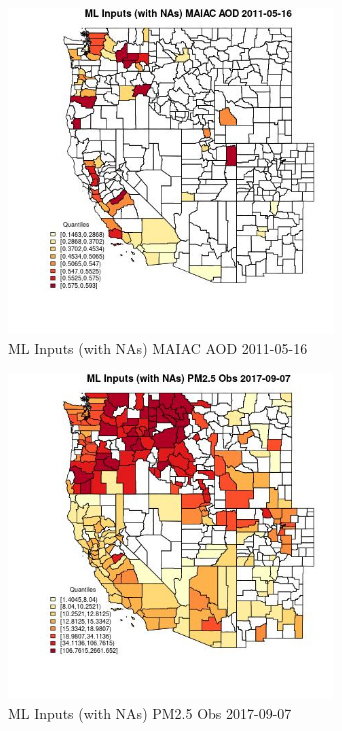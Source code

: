 \begin{figure} 
\centering  
\includegraphics[width=0.77\textwidth]{Code_Outputs/Report_ML_input_PM25_Step4_part_e_de_duplicated_aveswNAs_CountyMAIAC_AODMean2011-05-16_2011-05-16.jpg} 
\caption{\label{fig:Report_ML_input_PM25_Step4_part_e_de_duplicated_aveswNAsCountyMAIAC_AODMean2011-05-16_2011-05-16}ML Inputs (with NAs) MAIAC AOD 2011-05-16} 
\end{figure} 
 

\begin{figure} 
\centering  
\includegraphics[width=0.77\textwidth]{Code_Outputs/Report_ML_input_PM25_Step4_part_e_de_duplicated_aveswNAs_CountyPM25_ObsMean2017-09-07_2017-09-07.jpg} 
\caption{\label{fig:Report_ML_input_PM25_Step4_part_e_de_duplicated_aveswNAsCountyPM25_ObsMean2017-09-07_2017-09-07}ML Inputs (with NAs) PM2.5 Obs 2017-09-07} 
\end{figure} 
 

